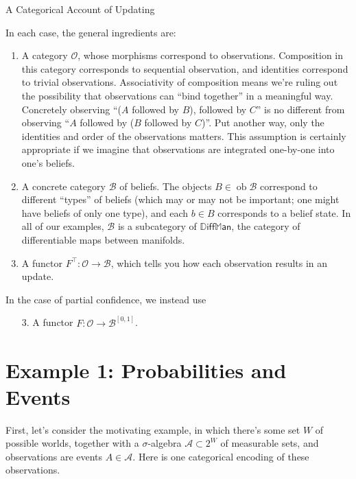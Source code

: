 \documentclass{article}
\DeclareMathOperator{\ob}{\mathrm{ob}}
\newcommand\B{\mathcal{B}}
\newcommand\Ob{\mathcal{O}}
\newcommand\DiffMan{\mathbb{D}\mathsf{iff}\mathbb{M}\mathsf{an}}
\begin{document}
    \begin{center}
        \Large
        A Categorical Account of Updating
    \end{center}
    
    In each case, the general ingredients are:
    \begin{enumerate}
        \item A category $\Ob$, whose morphisms correspond to observations.
        Composition in this category corresponds to sequential observation, and identities correspond to trivial observations.
        Associativity of composition means we're ruling out the possibility that observations can ``bind together'' in a meaningful way.
        Concretely observing ``($A$ followed by $B$), followed by $C$'' is no different from observing ``$A$ followed by ($B$ followed by $C$)''. 
        Put another way, only the identities and order of the observations matters. 
        This assumption is certainly appropriate if we imagine that observations are integrated one-by-one into one's beliefs.
         
        \item A concrete category $\B$ of beliefs.
        The objects $B \in \ob \B$ correspond to different ``types'' of beliefs (which may or may not be important; one might have beliefs of only one type),
        and each $b \in B$ corresponds to a belief state. 
        In all of our examples, $\B$ is a subcategory of $\DiffMan$, the category of differentiable maps between manifolds. 
        
        \item A functor $F^\top : \Ob \to \B$, which tells you how each observation results in an update. 
        
    \end{enumerate}
    In the case of partial confidence, we instead use
    \begin{enumerate}
        \item[3.] A functor $F : \mathcal O \to \mathcal B^{[0,1]}$. 
    \end{enumerate}
    
    \section{Example 1: Probabilities and Events}
    
    First, let's consider the motivating example, in which there's some set $W$ of possible worlds, together with a $\sigma$-algebra $\mathcal A \subset 2^W$ of measurable sets, and observations are events $A \in \mathcal A$. 
    Here is one categorical encoding of these observations. 
    
\end{document}
